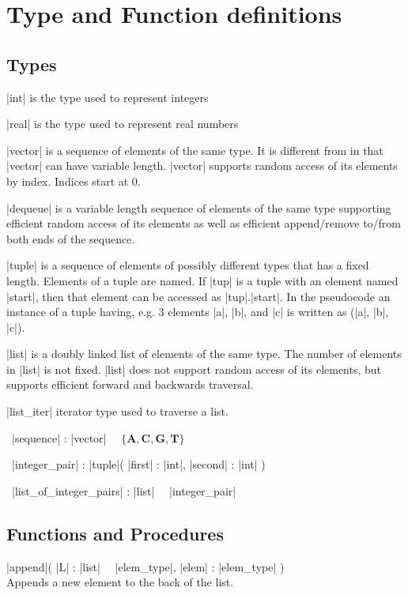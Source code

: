 \documentclass{article}
\newcommand{\OF}{\ \keyword{of}\ }
\newcommand{\TYPE}{\keyword{type}\ }
\begin{document}
\section{Type and Function definitions}\label{secpseudo}

\subsection{Types}

|int| is the type used to represent integers

|real| is the type used to represent real numbers

|vector| is a sequence of elements of the same type. It is different from
\ARRAY in that |vector| can have variable length. |vector| supports random
access of its elements by index. Indices start at $0$.

|dequeue| is a variable length sequence of elements of the same type supporting
efficient random access of its elements as well as efficient append/remove to/from
both ends of the sequence.

|tuple| is a sequence of elements of possibly different types that has a fixed
length. Elements of a tuple are named. If |tup| is a tuple with an element named
|start|, then that element can be accessed as |tup|.|start|. In the pseudocode
an instance of a tuple having, e.g. 3 elements |a|, |b|, and |c| is written
as (|a|, |b|, |c|).

|list| is a doubly linked list of elements of the same type. The number of
elements in |list| is not fixed. |list| does not support random access of its
elements, but supports efficient forward and backwards traversal.

|list_iter| iterator type used to traverse a list.

\TYPE |sequence| : |vector| \OF $\{ \mathbf{A}, \mathbf{C}, \mathbf{G}, \mathbf{T} \}$

\TYPE |integer_pair| : |tuple|( |first| : |int|, |second| : |int| )

\TYPE |list_of_integer_pairs| : |list| \OF |integer_pair|

\subsection{Functions and Procedures}

\PROC |append|( |L| : |list| \OF |elem_type|, |elem| : |elem_type| ) \ENDPROC \\
Appends a new element to the back of the list.
\end{document}
